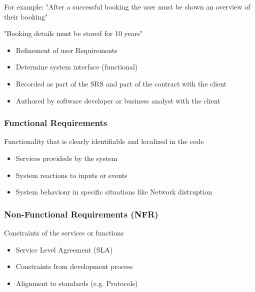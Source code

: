 \documentclass[
../../Software_Engineering_Summary.tex,
]
{subfiles}
\begin{document}
For example: "After a successful booking the user must be shown an overview of their booking"

"Booking details must be stored for 10 years"

\begin{greenbox}[Characteristics]
    \begin{itemize}
        \item Refinement of user Requirements
        \item Determine system interface (functional)
        \item Recorded as part of the SRS and part of the contract with the client
        \item Authored by software developer or business analyst with the client
    \end{itemize}
\end{greenbox}

\subsubsection{Functional Requirements}

\begin{greenbox*}
    Functionality that is clearly identifiable and localized in the code
    \begin{itemize}
        \item Services providede by the system
        \item System reactions to inputs or events
        \item System behaviour in specific situations like Network distruption
    \end{itemize}
\end{greenbox*}

\subsubsection{Non-Functional Requirements (NFR)}

\begin{greenbox*}
    Constraints of the services or functions
    \begin{itemize}
        \item Service Level Agreement (SLA)
        \item Constraints from development process 
        \item Alignment to standards (e.g. Protocols)
    \end{itemize}
\end{greenbox*}
\end{document}
